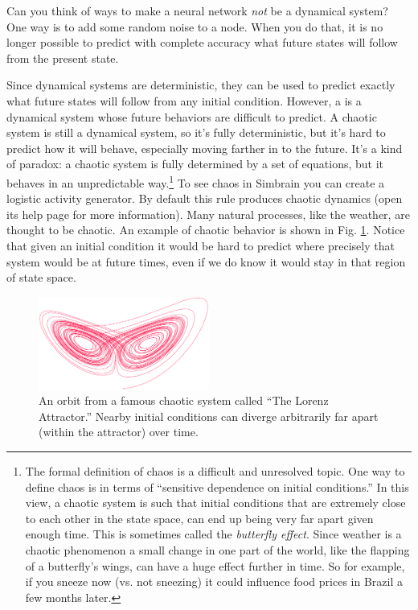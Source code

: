 Can you think of ways to make a neural network {\em not} be a dynamical 
system?  One way is to add some random noise to a node. When you do that, it 
is no longer possible to predict with complete accuracy what future states will follow from the present state.

Since dynamical systems are deterministic, they can be used to predict exactly what future states will follow from any initial condition. However, a  is a dynamical system whose future behaviors are difficult to predict. A chaotic system is still a dynamical system, so it's fully deterministic, but it's hard to predict how it will behave, especially moving farther in to the future. It's a kind of paradox: a chaotic system is fully determined by a set of equations, but it behaves in an unpredictable way.\footnote{The formal definition of chaos is a difficult and unresolved topic. One way to define chaos is in terms of ``sensitive dependence on initial conditions.'' In this view, a chaotic system is such that initial conditions that are extremely close to each other in the state space, can end up being very far apart given enough time. This is sometimes called the \emph{butterfly effect}. Since weather is a chaotic phenomenon a small change in one part of the world, like the flapping of a butterfly's wings, can have a huge effect further in time. So for example, if you sneeze now (vs. not sneezing) it could influence food prices in Brazil a few months later.} To see chaos in Simbrain you can create a logistic activity generator. By default this rule produces chaotic dynamics (open its help page for more information). Many natural processes, like the weather, are thought to be chaotic. An example of chaotic behavior is shown in Fig. \ref{F:chaoticStateSpace}. Notice that given an initial condition it would be hard to predict where precisely that system would be at future times, even if we do know it would stay in that region of state space.

\begin{figure}[h]
\centering
\includegraphics[width=0.5\textwidth]{./images/lorenzAttractor.png}
\caption[\url{https://commons.wikimedia.org/wiki/File:Lorenz_attractor2.svg}.]{An orbit from a famous chaotic system called ``The Lorenz Attractor.'' Nearby initial conditions can diverge arbitrarily far apart (within the attractor) over time. }
\label{F:chaoticStateSpace}
\end{figure}

